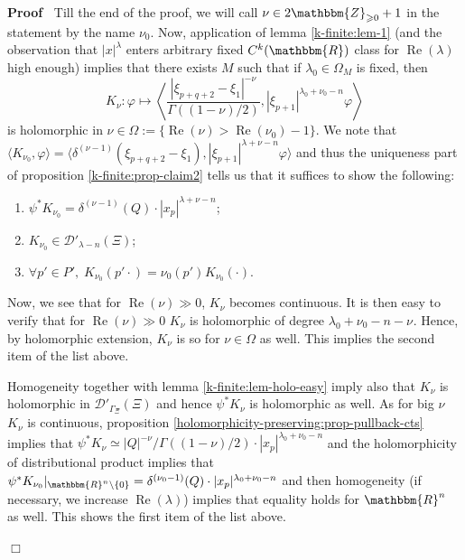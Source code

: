 \documentclass{article}
\newcommand{\assign}{:=}
\newcommand{\nocomma}{}
\newcommand{\tmop}[1]{\ensuremath{\operatorname{#1}}}
\newenvironment{proof}{\noindent\textbf{Proof\ }}{\hspace*{\fill}$\Box$\medskip}
\numberwithin{definition}{section}
\numberwithin{lemma}{section}
\numberwithin{proposition}{section}
{\theorembodyfont{\rmfamily}\newtheorem{remark}{Remark}
\numberwithin{remark}{section}
}
\begin{document}
\begin{proof}
  Till the end of the proof, we will call $\nu_{} \in 2\mathbbm{Z}_{\geqslant
  0} + 1$ in the statement by the name $\nu_0$. Now, application of lemma
  \ref{k-finite:lem-1} (and the observation that $| x |^{\lambda}$ enters
  arbitrary fixed $C^k ( \mathbbm{R})$ class for $\tmop{Re} ( \lambda)$ high
  enough) implies that there exists $M$ such that if $\lambda_0 \in \Omega_M$
  is fixed, then
  \[ K_{\nu} : \varphi \mapsto \left\langle \frac{| \xi_{p + q + 2} - \xi_1
     |^{- \nu}}{\Gamma ( ( 1 - \nu) / 2)} \nocomma, | \xi_{p + 1} |^{\lambda_0
     + \nu_0 - n} \varphi \nocomma \right\rangle \]
  is holomorphic in $\nu \in \Omega \assign \{ \tmop{Re} ( \nu) > \tmop{Re} (
  \nu_0) - 1 \}$. We note that $\langle K_{\nu_0}, \varphi \rangle = \langle
  \delta^{( \nu - 1)} ( \xi_{p + q + 2} - \xi_1) \nocomma, | \xi_{p + 1}
  |^{\lambda + \nu - n} \varphi \nocomma \rangle$ and thus the uniqueness part
  of proposition \ref{k-finite:prop-claim2} tells us that it suffices to show
  the following:
  \begin{enumerate}
    \item $\psi^{\ast} K_{\nu_0} = \delta^{( \nu - 1)} ( Q) \cdot | x_p
    |^{\lambda + \nu - n}$;
    
    \item $K_{\nu_0} \in \mathcal{D}'_{\lambda - n} ( \Xi)$;
    
    \item $\forall p' \in P', \; K_{\nu_0} ( p' \cdot) = \nu_0 ( p')^{}
    K_{\nu_0} ( \cdot)$.
  \end{enumerate}
  Now, we see that for $\tmop{Re} ( \nu) \gg 0$, $K_{\nu}$ becomes continuous.
  It is then easy to verify that for $\tmop{Re} ( \nu) \gg 0$ $K_{\nu}$ is
  holomorphic of degree $\lambda_0 + \nu_0 - n - \nu_{}$. Hence, by
  holomorphic extension, $K_{\nu}$ is so for $\nu \in \Omega$ as well. This
  implies the second item of the list above.
  
  Homogeneity together with lemma \ref{k-finite:lem-holo-easy} imply also that
  $K_{\nu}$ is holomorphic in $\mathcal{D}'_{\Gamma_{\Xi}} ( \Xi)$ and hence
  $\psi^{\ast} K_{\nu}$ is holomorphic as well. As for big $\nu$ $K_{\nu}$ is
  continuous, proposition \ref{holomorphicity-preserving:prop-pullback-cts}
  implies that $\psi^{\ast} K_{\nu} \simeq | Q |^{- \nu} / \Gamma ( ( 1 - \nu)
  / 2) \cdot | x_p |^{\lambda_0 + \nu_0 - n}$ and the holomorphicity of
  distributional product implies that $\psi^{\ast} K_{\nu_0} |_{\mathbbm{R}^n
  \backslash \{ 0 \}} = \delta^{( \nu_0 - 1)} ( Q) \cdot | x_p |^{\lambda_0 +
  \nu_0 - n}$ and then homogeneity (if necessary, we increase $\tmop{Re} (
  \lambda)$) implies that equality holds for $\mathbbm{R}^n$ as well. This
  shows the first item of the list above.
  

\end{proof}
\end{document}
